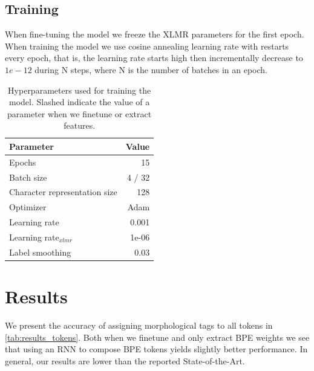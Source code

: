 \documentclass[11pt]{article}
\begin{document}
	
	\subsection{Training}
	
	When fine-tuning the model we freeze the XLMR parameters for the first epoch.
	When training the model we use cosine annealing learning rate with restarts every epoch, that is, the learning rate starts high then incrementally decrease to $1e-12$ during N steps, where N is the number of batches in an epoch.
	
	\begin{table}[h]
		\centering
		\begin{tabular}{lr}
			Parameter & Value \\
			\hline
			Epochs & 15 \\
			Batch size & 4 / 32 \\
			Character representation size & 128 \\
			Optimizer & Adam \\
			Learning rate & 0.001 \\
			Learning rate$_{xlmr}$ & 1e-06 \\
			Label smoothing & 0.03 \\
			
		\end{tabular}
		\caption{\label{tab:parameters} Hyperparameters used for training the model. Slashed indicate the value of a parameter when we finetune or extract features.}
	\end{table}

	
	\section{Results}
	\label{results}
	
	
	
	We present the accuracy of assigning morphological tags to all tokens in \cref{tab:results_tokens}. Both when we finetune and only extract BPE weights we see that using an RNN to compose BPE tokens yields slightly better performance.
	In general, our results are lower than the reported State-of-the-Art.
	
\end{document}
